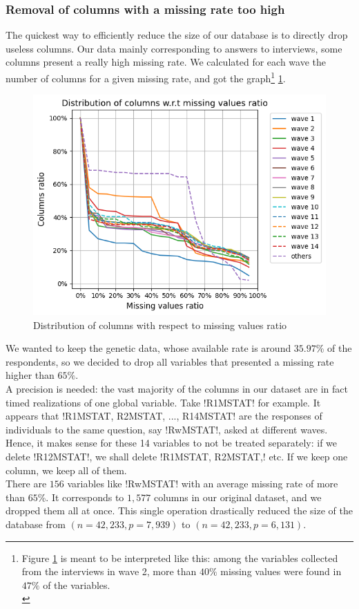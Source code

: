 \documentclass[]{article}
\begin{document}
\subsubsection{Removal of columns with a missing rate too high}
The quickest way to efficiently reduce the size of our database is to directly drop useless columns. Our data mainly corresponding to answers to interviews, some columns present a really high missing rate. We calculated for each wave the number of columns for a given missing rate, and got the graph\footnote{Figure \ref{distribution_of_columns_wrt_missing_values_ratio} is meant to be interpreted like this: among the variables collected from the interviews in wave 2, more than $40\%$ missing values were found in $47\%$ of the variables.\\} \ref{distribution_of_columns_wrt_missing_values_ratio}.
\begin{figure}[!h]
	\centering
	\includegraphics[scale = 0.7]{distribution_of_columns_wrt_missing_values_ratio.png}
	\caption{Distribution of columns with respect to missing values ratio}
	\label{distribution_of_columns_wrt_missing_values_ratio}
\end{figure}
We wanted to keep the genetic data, whose available rate is around $35.97$\% of the respondents, so we decided to drop all variables that presented a missing rate higher than $65\%$.\\
A precision is needed: the vast majority of the columns in our dataset are in fact timed realizations of one global variable. Take \pyth!R1MSTAT! for example. It appears that \pyth!R1MSTAT, R2MSTAT, ..., R14MSTAT! are the responses of individuals to the same question, say \pyth!RwMSTAT!, asked at different waves. Hence, it makes sense for these 14 variables to not be treated separately: if we delete \pyth!R12MSTAT!, we shall delete \pyth!R1MSTAT, R2MSTAT,! etc. If we keep one column, we keep all of them.\\
There are $156$ variables like \pyth!RwMSTAT! with an average missing rate of more than $65$\%. It corresponds to $1,577$ columns in our original dataset, and we dropped them all at once. This single operation drastically reduced the size of the database from $(n = 42,233, p = 7,939)$ to $(n = 42,233, p = 6,131)$.\\
\end{document}
